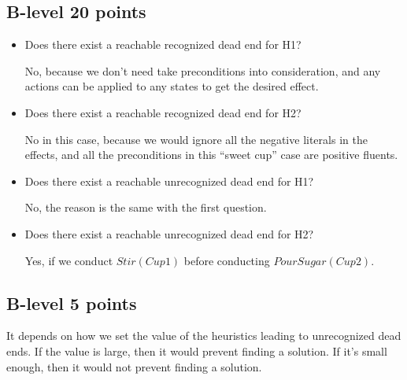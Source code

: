 \documentclass[11pt,a4paper]{article}
\begin{document}
\subsection{B-level 20 points}
\begin{itemize}
	\item Does there exist a reachable recognized dead end for H1?
	\par No, because we don't need take preconditions into consideration, and any actions can be applied to any states to get the desired effect.
	
	\item Does there exist a reachable recognized dead end for H2?
	\par No in this case, because we would ignore all the negative literals in the effects, and all the preconditions in this ``sweet cup'' case are positive fluents.

	\item Does there exist a reachable unrecognized dead end for H1?
	\par No, the reason is the same with the first question.

	\item Does there exist a reachable unrecognized dead end for H2?
	\par Yes, if we conduct $Stir(Cup1)$ before conducting $PourSugar(Cup2)$.
\end{itemize}

\subsection{B-level 5 points}
\par It depends on how we set the value of the heuristics leading to unrecognized dead ends. If the value is large, then it would prevent finding a solution. If it's small enough, then it would not prevent finding a solution. 
\end{document}
